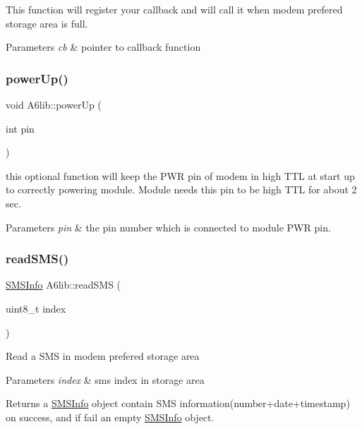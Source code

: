 This function will register your callback and will call it when modem prefered storage area is full. 
\begin{DoxyParams}{Parameters}
{\em cb} & pointer to callback function \\
\hline
\end{DoxyParams}
\mbox{\label{class_a6lib_add46e8926e5809cc7e33a7ad2817fcc5}} 
\subsubsection{\texorpdfstring{power\+Up()}{powerUp()}}
{\footnotesize\ttfamily void A6lib\+::power\+Up (\begin{DoxyParamCaption}\item[{int}]{pin }\end{DoxyParamCaption})}

this optional function will keep the P\+WR pin of modem in high T\+TL at start up to correctly powering module. Module needs this pin to be high T\+TL for about 2 sec. 
\begin{DoxyParams}{Parameters}
{\em pin} & the pin number which is connected to module P\+WR pin. \\
\hline
\end{DoxyParams}
\mbox{\label{class_a6lib_aad58cce8168f9554470f3afa854afb29}} 
\subsubsection{\texorpdfstring{read\+S\+M\+S()}{readSMS()}}
{\footnotesize\ttfamily \mbox{\hyperlink{struct_s_m_s_info}{S\+M\+S\+Info}} A6lib\+::read\+S\+MS (\begin{DoxyParamCaption}\item[{uint8\+\_\+t}]{index }\end{DoxyParamCaption})}

Read a S\+MS in modem prefered storage area 
\begin{DoxyParams}{Parameters}
{\em index} & sms index in storage area \\
\hline
\end{DoxyParams}
\begin{DoxyReturn}{Returns}
a \mbox{\hyperlink{struct_s_m_s_info}{S\+M\+S\+Info}} object contain S\+MS information(number+date+timestamp) on success, and if fail an empty \mbox{\hyperlink{struct_s_m_s_info}{S\+M\+S\+Info}} object. 
\end{DoxyReturn}
\mbox{\label{class_a6lib_a49996e929193a3a1942d58c884e919fb}} 
